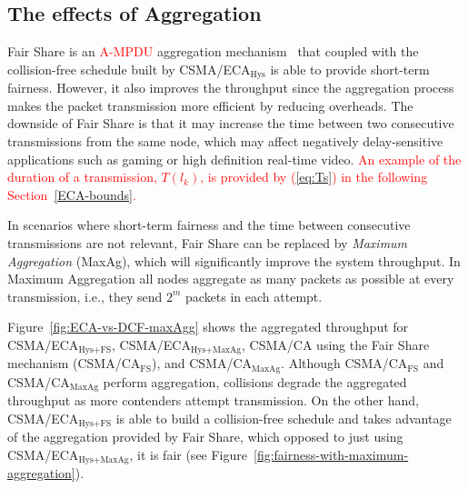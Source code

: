 	\subsection{The effects of Aggregation}\label{effects-of-aggregation}
	Fair Share is an \textcolor{red}{A-MPDU} aggregation mechanism~\cite{A-MPDU} that coupled with the collision-free schedule built by CSMA/ECA$_{\text{Hys}}$ is able to provide short-term fairness. However, it also improves the throughput since the aggregation process makes the packet transmission more efficient by reducing overheads. The downside of Fair Share is that it may increase the time between two consecutive transmissions from the same node, which may affect negatively delay-sensitive applications such as gaming or high definition real-time video. \textcolor{red}{An example of the duration of a transmission, $T(l_{k})$, is provided by (\ref{eq:Ts}) in the following Section~\ref{ECA-bounds}.}
	
	In scenarios where short-term fairness and the time between consecutive transmissions are not relevant, Fair Share can be replaced by \emph{Maximum Aggregation} (MaxAg), which will significantly improve the system throughput. In Maximum Aggregation all nodes aggregate as many packets as possible at every transmission, i.e., they send $2^m$ packets in each attempt.

	Figure~\ref{fig:ECA-vs-DCF-maxAgg} shows the aggregated throughput for CSMA/ECA$_{\text{Hys+FS}}$, CSMA/ECA$_{\text{Hys+MaxAg}}$, CSMA/CA using the Fair Share mechanism (CSMA/CA$_{\text{FS}}$), and CSMA/CA$_{\text{MaxAg}}$. Although CSMA/CA$_{\text{FS}}$ and CSMA/CA$_{\text{MaxAg}}$ perform aggregation, collisions degrade the aggregated throughput as more contenders attempt transmission. On the other hand, CSMA/ECA$_{\text{Hys+FS}}$ is able to build a collision-free schedule and takes advantage of the aggregation provided by Fair Share, which opposed to just using CSMA/ECA$_{\text{Hys+MaxAg}}$, it is fair (see Figure~\ref{fig:fairness-with-maximum-aggregation}).
	

